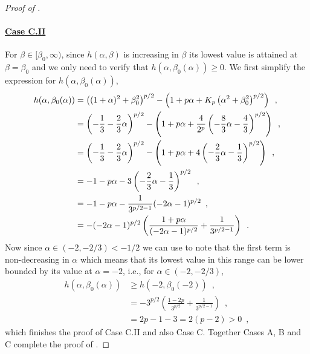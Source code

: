 \begin{proof}[Proof of ]
    \paragraph{\underline{Case C.II}} For $\beta \in [\beta_0, \infty)$, since $h(\alpha, \beta)$ is increasing in $\beta$ its lowest value is attained at $\beta=\beta_0$ and we only need to verify that $h(\alpha, \beta_0(\alpha)) \geq 0$. We first simplify the expression for $h(\alpha, \beta_0(\alpha))$,
    \begin{align*}
        h(\alpha, \beta_0(\alpha)) &=  \left((1+\alpha)^2+\beta_0^2\right)^{p/2} - \left(1+p\alpha + K_p\left(\alpha^2+\beta_0^2\right)^{p/2}\right)\enspace,\\
        &= \left(-\frac{1}{3}-\frac{2}{3}\alpha\right)^{p/2} - \left(1+p\alpha + \frac{4}{2^p}\left(-\frac{8}{3}\alpha -\frac{4}{3}\right)^{p/2}\right)\enspace,\\
        &= \left(-\frac{1}{3}-\frac{2}{3}\alpha\right)^{p/2} - \left(1+p\alpha + 4\left(-\frac{2}{3}\alpha -\frac{1}{3}\right)^{p/2}\right)\enspace,\\
        &= -1 - p\alpha - 3\left(-\frac{2}{3}\alpha -\frac{1}{3}\right)^{p/2}\enspace,\\
        &= -1 - p\alpha - \frac{1}{3^{p/2-1}}(-2\alpha -1)^{p/2}\enspace,\\
        &= -(-2\alpha-1)^{p/2}\left(\frac{1+p\alpha}{(-2\alpha-1)^{p/2}} + \frac{1}{3^{p/2-1}}\right)\enspace. 
    \end{align*}
    Now since $\alpha\in (-2,-2/3)<-1/2$ we can use  to note that the first term is non-decreasing in $\alpha$ which means that its lowest value in this range can be lower bounded by its value at $\alpha = -2$, i.e., for $\alpha\in (-2,-2/3)$,
    \begin{align*}
        h(\alpha, \beta_0(\alpha)) &\geq h(-2, \beta_0(-2))\enspace,\\ 
        &= -3^{p/2}\left(\frac{1-2p}{3^{p/2}} + \frac{1}{3^{p/2-1}}\right)\enspace,\\
        &= 2p-1-3 = 2(p-2) > 0\enspace,
    \end{align*}
    which finishes the proof of Case C.II and also Case C. Together Cases A, B and C complete the proof of .  

\end{proof}
